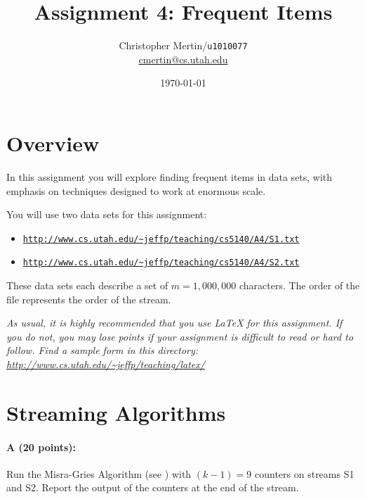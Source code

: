 \documentclass[11pt]{article}
\title{Assignment 4: Frequent Items}
\author{Christopher Mertin/{\tt u1010077}\\
\url{cmertin@cs.utah.edu}}
\date{\today}
\begin{document}
\maketitle





\section*{Overview}

In this assignment you will explore finding frequent items in data sets, with emphasis on techniques designed to work at enormous scale.  

You will use two data sets for this assignment:
\begin{itemize} \denselist
\item \href{http://www.cs.utah.edu/~jeffp/teaching/cs5140/A4/S1.txt}{\texttt{http://www.cs.utah.edu/\~{}jeffp/teaching/cs5140/A4/S1.txt}}
\item \href{http://www.cs.utah.edu/~jeffp/teaching/cs5140/A4/S2.txt}{\texttt{http://www.cs.utah.edu/\~{}jeffp/teaching/cs5140/A4/S2.txt}}
\end{itemize}
These data sets each describe a set of $m = 1{,}000{,}000$ characters.  The order of the file represents the order of the stream.  

\vspace{.1in}

\emph{As usual, it is highly recommended that you use LaTeX for this assignment.  If you do not, you may lose points if your assignment is difficult to read or hard to follow.  Find a sample form in this directory:
\url{http://www.cs.utah.edu/~jeffp/teaching/latex/}}


\section{Streaming Algorithms}

\paragraph{A (20 points):}  
Run the Misra-Gries Algorithm (see \textbf{}) with $(k-1)=9$ counters on streams S1 and S2.  Report the output of the counters at the end of the stream.  
\end{document}
